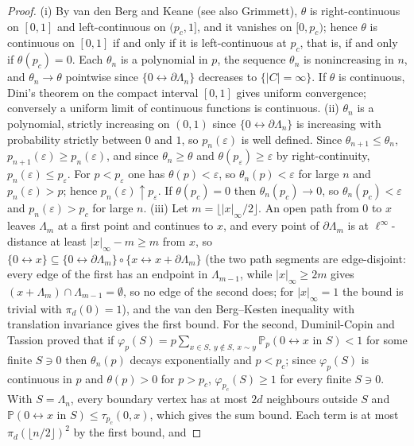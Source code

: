 \documentclass[11pt]{article}
\theoremstyle{definition}
\newcommand{\Pp}{\mathbb P}
\newcommand{\eps}{\varepsilon}
\providecommand{\Pp}{\mathbb P}
\begin{document}
\begin{proof}
{\rm(i)} By van den Berg and Keane (see also
Grimmett), $\theta$ is right-continuous on
$[0,1]$ and left-continuous on $(p_c,1]$, and it vanishes on $[0,p_c)$;
hence $\theta$ is continuous on $[0,1]$ if and only if it is
left-continuous at $p_c$, that is, if and only if $\theta(p_c)=0$.  Each
$\theta_n$ is a polynomial in $p$, the sequence $\theta_n$ is
nonincreasing in $n$, and $\theta_n\to\theta$ pointwise since
$\{0\leftrightarrow\partial\Lambda_n\}$ decreases to $\{|C|=\infty\}$.  If
$\theta$ is continuous, Dini's theorem on the compact interval $[0,1]$
gives uniform convergence; conversely a uniform limit of continuous
functions is continuous.
{\rm(ii)} $\theta_n$ is a polynomial, strictly increasing on $(0,1)$ since
$\{0\leftrightarrow\partial\Lambda_n\}$ is increasing with probability
strictly between $0$ and $1$, so $p_n(\eps)$ is well defined.  Since
$\theta_{n+1}\le\theta_n$, $p_{n+1}(\eps)\ge p_n(\eps)$, and since
$\theta_n\ge\theta$ and $\theta(p_\eps)\ge\eps$ by right-continuity,
$p_n(\eps)\le p_\eps$.  For $p<p_\eps$ one has $\theta(p)<\eps$, so
$\theta_n(p)<\eps$ for large $n$ and $p_n(\eps)>p$; hence
$p_n(\eps)\uparrow p_\eps$.  If $\theta(p_c)=0$ then $\theta_n(p_c)\to0$,
so $\theta_n(p_c)<\eps$ and $p_n(\eps)>p_c$ for large $n$.
{\rm(iii)} Let $m=\lfloor|x|_\infty/2\rfloor$.  An open path from $0$ to
$x$ leaves $\Lambda_m$ at a first point and continues to $x$, and
every point of $\partial\Lambda_m$ is at $\ell^\infty$-distance at least
$|x|_\infty-m\ge m$ from $x$, so
$\{0\leftrightarrow x\}\subseteq\{0\leftrightarrow\partial\Lambda_m\}\circ\{x\leftrightarrow x+\partial\Lambda_m\}$
(the two path segments are edge-disjoint: every edge of the first has an
endpoint in $\Lambda_{m-1}$, while $|x|_\infty\ge2m$ gives
$(x+\Lambda_m)\cap\Lambda_{m-1}=\emptyset$, so no edge of the second does;
for $|x|_\infty=1$ the bound is trivial with $\pi_d(0)=1$),
and the van den Berg--Kesten inequality with
translation invariance gives the first bound.  For the second, Duminil-Copin
and Tassion proved that if
$\varphi_p(S)=p\sum_{x\in S,\ y\notin S,\ x\sim y}\Pp_p(0\leftrightarrow x\text{ in }S)<1$
for some finite $S\ni0$ then $\theta_n(p)$ decays exponentially and
$p<p_c$; since $\varphi_p(S)$ is continuous in $p$ and $\theta(p)>0$ for
$p>p_c$, $\varphi_{p_c}(S)\ge1$ for every finite $S\ni0$.  With
$S=\Lambda_n$, every boundary vertex has at most $2d$ neighbours outside
$S$ and $\Pp(0\leftrightarrow x\text{ in }S)\le\tau_{p_c}(0,x)$, which
gives the sum bound.  Each term is at most
$\pi_d(\lfloor n/2\rfloor)^2$ by the first bound, and

\end{proof}
\end{document}
